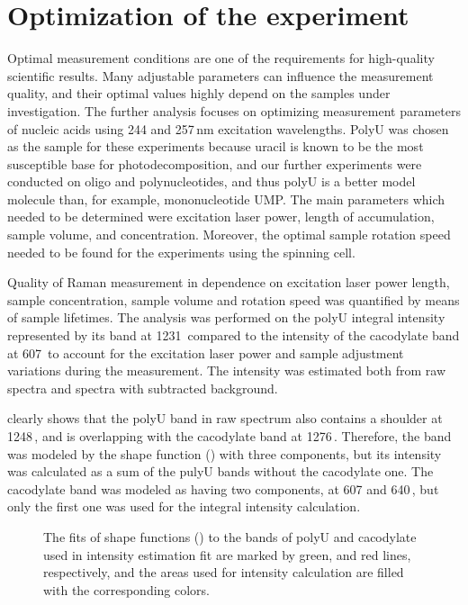 \section{Optimization of the experiment}

Optimal measurement conditions are one of the requirements for high-quality
scientific results.
Many adjustable parameters can influence the measurement quality, and their
optimal values highly depend on the samples under investigation.
The further analysis focuses on optimizing measurement parameters of nucleic
acids using 244 and 257\,nm excitation wavelengths.
PolyU was chosen as the sample for these experiments because uracil is known to
be the most susceptible base for photodecomposition, and our further
experiments were conducted on oligo and polynucleotides, and thus polyU is a
better model molecule than, for example, mononucleotide UMP.
The main parameters which needed to be determined were excitation laser power,
length of accumulation, sample volume, and concentration.
Moreover, the optimal sample rotation speed needed to be found for the
experiments using the spinning cell.

Quality of Raman measurement in dependence on excitation laser power length,
sample concentration, sample volume and rotation speed was quantified by means
of sample lifetimes.
The analysis was performed on the polyU integral intensity represented by
its band at 1231\,\icm{} compared to the intensity of the cacodylate band at
607\,\icm{} to account for the excitation laser power and sample adjustment
variations during the measurement.
The intensity was estimated both from raw spectra and spectra with subtracted
background.

clearly shows that the polyU band in raw spectrum also contains a shoulder at
1248\,\icm{}, and is overlapping with the cacodylate band at 1276\,\icm.
Therefore, the band was modeled by the shape function
()
with three components, but its intensity was calculated as a sum of the pulyU
bands without the cacodylate one.
The cacodylate band was modeled as having two components, at 607 and 640\,\icm,
but only the first one was used for the integral intensity calculation.

\begin{figure}
	\centering
	
	\caption[%
		Example UV RR spectrum of polyU dissolved in cacodylate buffer.%
	]{%
		The fits of shape functions
		()
		to the bands of polyU and cacodylate used in intensity estimation fit are
		marked by green, and red lines, respectively, and the areas used for
		intensity calculation are filled with the corresponding colors.
	}
	\label{\figlabel{power_optim:triplexes_pU}}
\end{figure}

